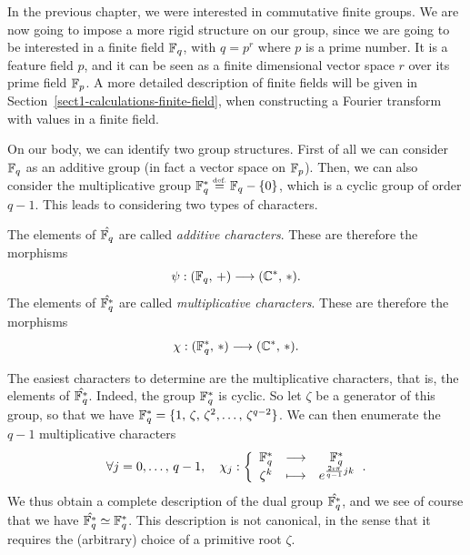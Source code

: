  
In the previous chapter, we were interested in commutative finite groups. We are now going to impose a more rigid structure on our group, since we are going to be interested in a finite field $ \mathbb{F}_q $, with $ q = p^r $ where $ p $ is a prime number. It is a feature field $ p $, and it can be seen as a finite dimensional vector space $ r $ over its prime field $ \mathbb{F}_p $. A more detailed description of finite fields will be given in Section~\ref{sect1-calculations-finite-field}, when constructing a Fourier transform with values in a finite field.
 
 
On our body, we can identify two group structures. First of all we can consider $ \mathbb{F}_q $ as an additive group (in fact a vector space on $ \mathbb{F}_p $). Then, we can also consider the multiplicative group $ \mathbb{F}_q^* \stackrel{\mbox{\upshape\tiny def.}}{=} \mathbb{F}_q - \{0\} $, which is a cyclic group of order $ q-1 $. This leads to considering two types of characters.
 
\begin{defn}
  The elements of $ \hat{\mathbb{F}_q} $ are called \textit{additive characters}. These are therefore the morphisms
\begin{equation*}
\psi: (\mathbb{F}_q, \, +) \longrightarrow (\mathbb{C}^*, \, *).
\end{equation*}
The elements of $ \hat{\mathbb{F}_q^*} $ are called \textit{multiplicative characters}. These are therefore the morphisms
\begin{equation*}
\chi: (\mathbb{F}_q^*, \, *) \longrightarrow (\mathbb{C}^*, \, *).
\end{equation*}
\end{defn}
 
 
 
The easiest characters to determine are the multiplicative characters, that is, the elements of $ \hat{\mathbb{F}_q^*} $. Indeed, the group $ \mathbb{F}_q^* $ is cyclic. So let $ \zeta $ be a generator of this group, so that we have $ \mathbb{F}_q^* = \{1, \, \zeta, \, \zeta^2, \ldots, \, \zeta^{q-2}\} $. We can then enumerate the $ q-1 $ multiplicative characters
\begin{equation*}
\forall j = 0, \ldots, \, q-1, \quad \chi_j: {\left\{ \begin{array}{ccc} \mathbb{F}_q^* & \longrightarrow & \mathbb{F}_q^* \\ \zeta^k & \longmapsto & e^{\frac{2 \imath \pi}{q-1} jk} \end{array} \right.}.
\end{equation*}
We thus obtain a complete description of the dual group $ \hat{\mathbb{F}_q^*} $, and we see of course that we have $ \hat{\mathbb{F}_q^*} \simeq \mathbb{F}_q^* $. This description is not canonical, in the sense that it requires the (arbitrary) choice of a primitive root $ \zeta $.
 
